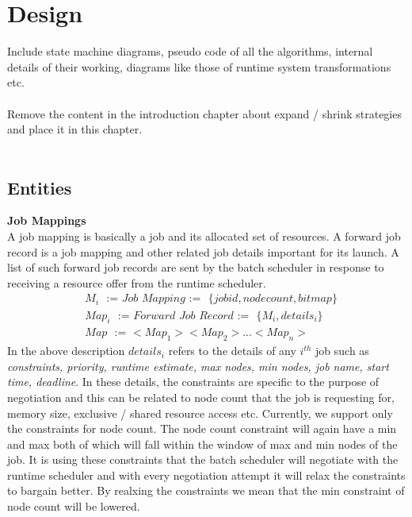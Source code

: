 \chapter{Design}
\label{chapter:ischeduler}
Include state machine diagrams, pseudo code of all the algorithms, internal details of their working, diagrams like those of runtime system transformations etc.\\ \\
Remove the content in the introduction chapter about expand / shrink strategies and place it in this chapter.\\ \\
\section{Entities}
\textbf{Job Mappings}\\
A job mapping is basically a job and its allocated set of resources. A forward job record is a job mapping and other related job details important for its launch. A list of such forward job records are sent by the batch scheduler in response to receiving a resource offer from the runtime scheduler.\\
\begin{equation*}
\begin{aligned}
&M_{i}\ \ \ \textit{:=\ \ \ Job Mapping\ \ \ :=}\ \ \ \{jobid,node count,bitmap\}\\
&Map_{i}\ \ \ \textit{:=\ \ \ Forward Job Record\ \ \ :=}\ \ \ \{M_{i},details_{i}\}\\
&Map\ \ \ \textit{:=\ \ \ {$<Map_{1}><Map_{2}>...<Map_{n}>$}}
\end{aligned}
\end{equation*}
In the above description $details_{i}$ refers to the details of any $i^{th}$ job such as \textit{constraints, priority, runtime estimate, max nodes, min nodes, job name, start time, deadline}. In these details, the constraints are specific to the purpose of negotiation and this can be related to node count that the job is requesting for, memory size, exclusive / shared resource access etc. Currently, we support only the constraints for node count. The node count constraint will again have a min and max both of which will fall within the window of max and min nodes of the job. It is using these constraints that the batch scheduler will negotiate with the runtime scheduler and with every negotiation attempt it will relax the constraints to bargain better. By realxing the constraints we mean that the min constraint of node count will be lowered.\\ \\
